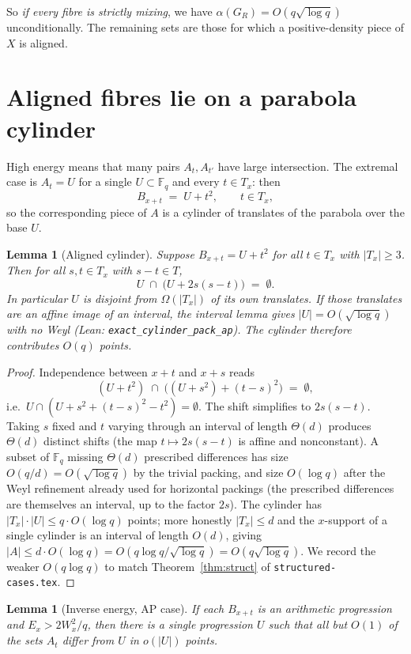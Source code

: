 \documentclass[11pt]{article}
\newtheorem{lemma}[theorem]{Lemma}
\theoremstyle{definition}
\newcommand{\F}{\mathbb{F}}
\begin{document}
So \emph{if every fibre is strictly mixing}, we have $\alpha(G_R)=O(q\sqrt{\log q})$ unconditionally.
The remaining sets are those for which a positive-density piece of $X$ is aligned.

\section{Aligned fibres lie on a parabola cylinder}

High energy means that many pairs $A_t,A_{t'}$ have large intersection.
The extremal case is $A_t=U$ for a single $U\subset\F_q$ and every $t\in T_x$: then
\[
  B_{x+t}\;=\;U+t^{2},
  \qquad t\in T_x,
\]
so the corresponding piece of $A$ is a cylinder of translates of the parabola over the base $U$.

\begin{lemma}[Aligned cylinder]\label{lem:cyl}
Suppose $B_{x+t}=U+t^{2}$ for all $t\in T_x$ with $|T_x|\ge 3$.
Then for all $s,t\in T_x$ with $s-t\in T$,
\[
  U\;\cap\;\bigl(U+2s(s-t)\bigr)\;=\;\emptyset.
\]
In particular $U$ is disjoint from $\Omega(|T_x|)$ of its own translates.
If those translates are an affine image of an interval, the interval lemma
gives $|U|=O(\sqrt{\log q})$ with no Weyl
(Lean: \texttt{exact\_cylinder\_pack\_ap}).
The cylinder therefore contributes $O(q)$ points.
\end{lemma}

\begin{proof}
Independence between $x+t$ and $x+s$ reads
\[
  (U+t^{2})\;\cap\;\bigl((U+s^{2})+(t-s)^{2}\bigr)\;=\;\emptyset,
\]
i.e.\ $U\cap(U+s^{2}+(t-s)^{2}-t^{2})=\emptyset$.
The shift simplifies to $2s(s-t)$.
Taking $s$ fixed and $t$ varying through an interval of length $\Theta(d)$ produces $\Theta(d)$ distinct shifts (the map $t\mapsto 2s(s-t)$ is affine and nonconstant).
A subset of $\F_q$ missing $\Theta(d)$ prescribed differences has size $O(q/d)=O(\sqrt{\log q})$ by the trivial packing, and size $O(\log q)$ after the Weyl refinement already used for horizontal packings (the prescribed differences are themselves an interval, up to the factor $2s$).
The cylinder has $|T_x|\cdot|U|\le q\cdot O(\log q)$ points; more honestly $|T_x|\le d$ and the $x$-support of a single cylinder is an interval of length $O(d)$, giving $|A|\le d\cdot O(\log q)=O(q\log q/\sqrt{\log q})=O(q\sqrt{\log q})$.
We record the weaker $O(q\log q)$ to match Theorem~\ref{thm:struct} of \texttt{structured-cases.tex}.
\end{proof}

\begin{lemma}[Inverse energy, AP case]\label{lem:inverse-ap}
If each $B_{x+t}$ is an arithmetic progression and $E_x>2W_x^{2}/q$, then there is a single progression $U$ such that all but $O(1)$ of the sets $A_t$ differ from $U$ in $o(|U|)$ points.
\end{lemma}
\end{document}
